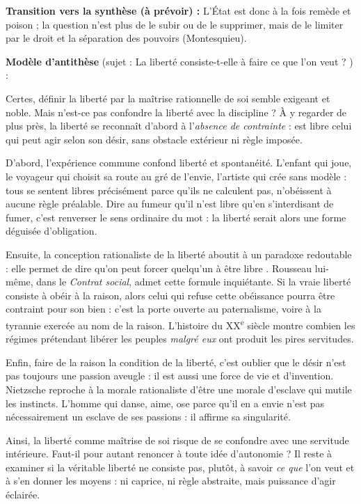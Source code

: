 \documentclass[11pt]{article}
\begin{document}
\begin{corrige}
\textbf{Transition vers la synthèse (à prévoir) :} \og L'État est donc à la fois remède et poison ; la question n'est plus de le subir ou de le supprimer, mais de le limiter par le droit et la séparation des pouvoirs (Montesquieu). \fg{}
\end{corrige}

\begin{corrige}
\textbf{Modèle d'antithèse} (sujet : \og La liberté consiste-t-elle à faire ce que l'on veut ? \fg{}) :

\medskip
Certes, définir la liberté par la maîtrise rationnelle de soi semble exigeant et noble. Mais n'est-ce pas confondre la liberté avec la discipline ? À y regarder de plus près, la liberté se reconnaît d'abord à l'\emph{absence de contrainte} : est libre celui qui peut agir selon son désir, sans obstacle extérieur ni règle imposée.

D'abord, l'expérience commune confond liberté et spontanéité. L'enfant qui joue, le voyageur qui choisit sa route au gré de l'envie, l'artiste qui crée sans modèle : tous se sentent libres précisément parce qu'ils ne calculent pas, n'obéissent à aucune règle préalable. Dire au fumeur qu'il n'est libre qu'en s'interdisant de fumer, c'est renverser le sens ordinaire du mot : la liberté serait alors une forme déguisée d'obligation.

Ensuite, la conception rationaliste de la liberté aboutit à un paradoxe redoutable : elle permet de dire qu'on peut \og forcer quelqu'un à être libre \fg{}. Rousseau lui-même, dans le \emph{Contrat social}, admet cette formule inquiétante. Si la vraie liberté consiste à obéir à la raison, alors celui qui refuse cette obéissance pourra être contraint \og pour son bien \fg{} : c'est la porte ouverte au paternalisme, voire à la tyrannie exercée au nom de la raison. L'histoire du XX\textsuperscript{e} siècle montre combien les régimes prétendant libérer les peuples \emph{malgré eux} ont produit les pires servitudes.

Enfin, faire de la raison la condition de la liberté, c'est oublier que le désir n'est pas toujours une passion aveugle : il est aussi une force de vie et d'invention. Nietzsche reproche à la morale rationaliste d'être une morale d'esclave qui mutile les instincts. L'homme qui danse, aime, ose \og parce qu'il en a envie \fg{} n'est pas nécessairement un esclave de ses passions : il affirme sa singularité.

Ainsi, la liberté comme maîtrise de soi risque de se confondre avec une servitude intérieure. Faut-il pour autant renoncer à toute idée d'autonomie ? Il reste à examiner si la véritable liberté ne consiste pas, plutôt, à savoir \emph{ce que} l'on veut et à s'en donner les moyens : ni caprice, ni règle abstraite, mais puissance d'agir éclairée.


\end{corrige}
\end{document}

